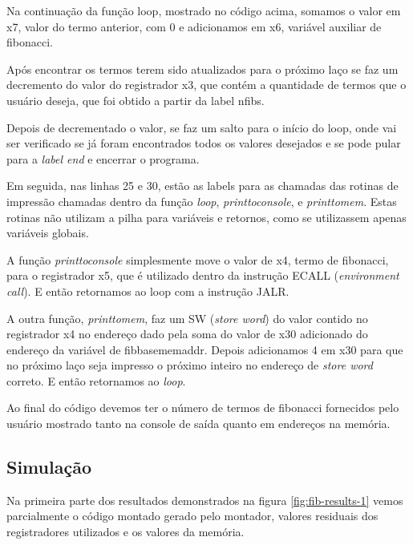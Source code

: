 	Na continuação da função loop, mostrado no código acima, somamos o valor em x7, valor do termo anterior, com 0 e adicionamos em x6, variável auxiliar de fibonacci.

	Após encontrar os termos terem sido atualizados para o próximo laço se faz um decremento do valor do registrador x3, que contém a quantidade de termos que o usuário deseja, que foi obtido a partir da label n\textunderscore fibs.

	Depois de decrementado o valor, se faz um salto para o início do loop, onde vai ser verificado se já foram encontrados todos os valores desejados e se pode pular para a \textit{label end} e encerrar o programa. 

	Em seguida, nas linhas 25 e 30, estão as labels para as chamadas das rotinas de impressão chamadas dentro da função \textit{loop}, \textit{print\textunderscore to\textunderscore console}, e \textit{print\textunderscore to\textunderscore mem}. Estas rotinas não utilizam a pilha para variáveis e retornos, como se utilizassem apenas variáveis globais.

	A função \textit{print\textunderscore to\textunderscore console} simplesmente move o valor de x4, termo de fibonacci, para o registrador x5, que é utilizado dentro da instrução ECALL (\textit{environment call}). E então retornamos ao loop com a instrução JALR.

	A outra função, \textit{print\textunderscore to\textunderscore mem}, faz um SW (\textit{store word}) do valor contido no registrador x4 no endereço dado pela soma do valor de x30 adicionado do endereço da variável de fib\textunderscore base\textunderscore mem\textunderscore addr. Depois adicionamos 4 em x30 para que no próximo laço seja impresso o próximo inteiro no endereço de \textit{store word} correto. E então retornamos ao \textit{loop}.

	Ao final do código devemos ter o número de termos de fibonacci fornecidos pelo usuário mostrado tanto na console de saída quanto em endereços na memória.


\subsection{Simulação}

	
	Na primeira parte dos resultados demonstrados na figura \ref{fig:fib-results-1} vemos parcialmente o código montado gerado pelo montador, valores residuais dos registradores utilizados e os valores da memória.

